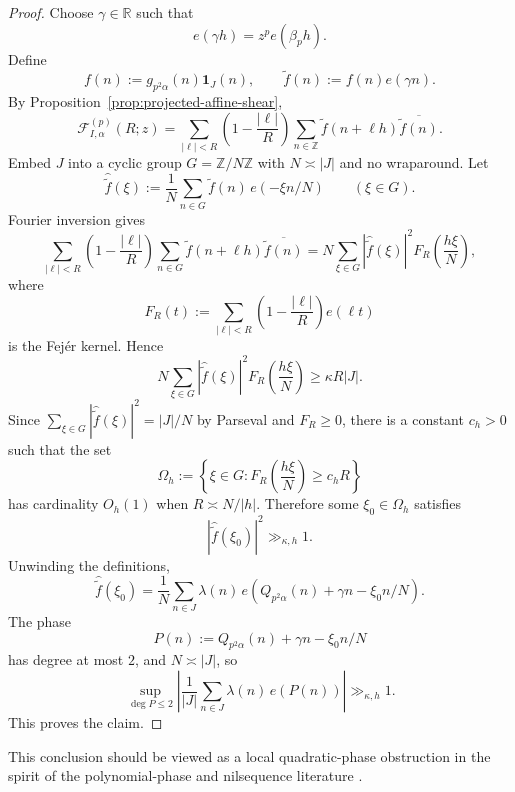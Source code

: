 \documentclass[11pt]{scrartcl}
\numberwithin{equation}{section}
\theoremstyle{definition}
\newcommand{\Z}{\mathbb Z}
\newcommand{\R}{\mathbb R}
\newcommand{\1}{\mathbf 1}
\newcommand{\ee}[1]{e\!\left(#1\right)}
\begin{document}
\begin{proof}
Choose $\gamma\in\R$ such that
\[
\ee{\gamma h}=z^p\ee{\beta_p h}.
\]
Define
\[
f(n):=g_{p^2\alpha}(n)\mathbf 1_J(n),
\qquad
\widetilde f(n):=f(n)\ee{\gamma n}.
\]
By Proposition~\ref{prop:projected-affine-shear},
\[
\mathcal F^{(p)}_{I,\alpha}(R;z)
=
\sum_{|\ell|<R}\left(1-\frac{|\ell|}{R}\right)
\sum_{n\in\Z}\widetilde f(n+\ell h)\overline{\widetilde f(n)}.
\]
Embed $J$ into a cyclic group $G=\Z/N\Z$ with $N\asymp |J|$ and no wraparound. Let
\[
\widehat{\widetilde f}(\xi):=\frac1N\sum_{n\in G}\widetilde f(n)\,\ee{-\xi n/N}
\qquad (\xi\in G).
\]
Fourier inversion gives
\[
\sum_{|\ell|<R}\left(1-\frac{|\ell|}{R}\right)
\sum_{n\in G}\widetilde f(n+\ell h)\overline{\widetilde f(n)}
=
N\sum_{\xi\in G}|\widehat{\widetilde f}(\xi)|^2F_R\!\left(\frac{h\xi}{N}\right),
\]
where
\[
F_R(t):=\sum_{|\ell|<R}\left(1-\frac{|\ell|}{R}\right)\ee{\ell t}
\]
is the Fej\'er kernel. Hence
\[
N\sum_{\xi\in G}|\widehat{\widetilde f}(\xi)|^2F_R\!\left(\frac{h\xi}{N}\right)
\ge \kappa R|J|.
\]
Since $\sum_{\xi\in G}|\widehat{\widetilde f}(\xi)|^2=|J|/N$ by Parseval and $F_R\ge 0$, there is a constant $c_h>0$ such that the set
\[
\Omega_h:=\left\{\xi\in G: F_R\!\left(\frac{h\xi}{N}\right)\ge c_hR\right\}
\]
has cardinality $O_h(1)$ when $R\asymp N/|h|$. Therefore some $\xi_0\in\Omega_h$ satisfies
\[
|\widehat{\widetilde f}(\xi_0)|^2\gg_{\kappa,h}1.
\]
Unwinding the definitions,
\[
\widehat{\widetilde f}(\xi_0)
=
\frac1N\sum_{n\in J}\lambda(n)
\,\ee{Q_{p^2\alpha}(n)+\gamma n-\xi_0n/N}.
\]
The phase
\[
P(n):=Q_{p^2\alpha}(n)+\gamma n-\xi_0n/N
\]
has degree at most $2$, and $N\asymp |J|$, so
\[
\sup_{\deg P\le 2}
\left|\frac{1}{|J|}\sum_{n\in J}\lambda(n)\,\ee{P(n)}\right|
\gg_{\kappa,h}1.
\]
This proves the claim.
\end{proof}

This conclusion should be viewed as a local quadratic-phase obstruction in the spirit of the polynomial-phase and nilsequence literature \cite{greentao2012mobiusnil,matomaki2023higher,matomakiShao2021poly}.
\end{document}
